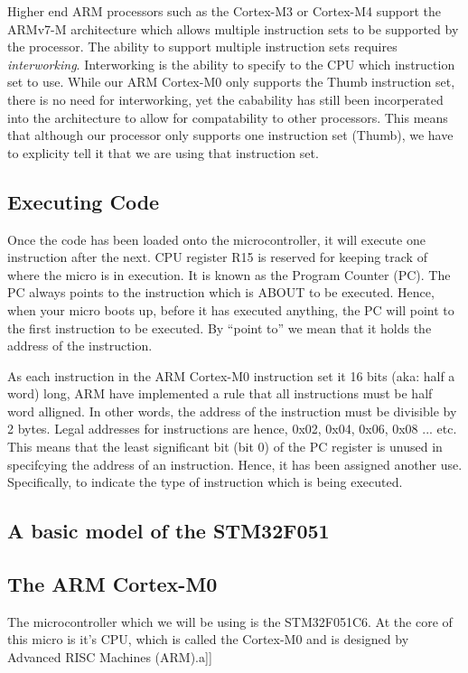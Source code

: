 Higher end ARM processors such as the Cortex-M3 or Cortex-M4 support the ARMv7-M architecture which allows multiple instruction sets to be supported by the processor. 
The ability to support multiple instruction sets requires \emph{interworking}. Interworking is the ability to specify to the CPU which instruction set to use. 
While our ARM Cortex-M0 only supports the Thumb instruction set, there is no need for interworking, yet the cabability has still been incorperated into the architecture to allow for compatability to other processors. 
This means that although our processor only supports one instruction set (Thumb), we have to explicity tell it that we are using that instruction set. 


\subsection{Executing Code}
Once the code has been loaded onto the microcontroller, it will execute one instruction after the next. 
CPU register R15 is reserved for keeping track of where the micro is in execution. It is known as the Program Counter (PC).
The PC always points to the instruction which is ABOUT to be executed. Hence, when your micro boots up, before it has executed anything, the PC will point to the first instruction to be executed.
By ``point to'' we mean that it holds the address of the instruction. 

As each instruction in the ARM Cortex-M0 instruction set it 16 bits (aka: half a word) long, ARM have implemented a rule that all instructions must be half word alligned. In other words, the address of the instruction must be divisible by 2 bytes. Legal addresses for instructions are hence, 0x02, 0x04, 0x06, 0x08 ... etc. 
This means that the least significant bit (bit 0) of the PC register is unused in specifcying the address of an instruction. 
Hence, it has been assigned another use. Specifically, to indicate the type of instruction which is being executed. 



\subsection{A basic model of the STM32F051}

\subsection{The ARM Cortex-M0}
The microcontroller which we will be using is the STM32F051C6. At the core of this micro is it's CPU, which is called the Cortex-M0 and is designed by Advanced RISC Machines (ARM).a]]

